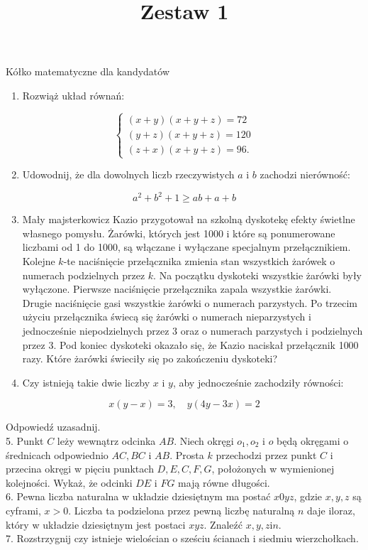 \documentclass[10pt]{article}
\title{Zestaw 1 }
\author{}
\date{}
\begin{document}
\maketitle
Kółko matematyczne dla kandydatów

\begin{enumerate}
  \item Rozwiąż układ równań:
\end{enumerate}

\[
\left\{\begin{array}{l}
(x+y)(x+y+z)=72 \\
(y+z)(x+y+z)=120 \\
(z+x)(x+y+z)=96 .
\end{array}\right.
\]

\begin{enumerate}
  \setcounter{enumi}{1}
  \item Udowodnij, że dla dowolnych liczb rzeczywistych \(a\) i \(b\) zachodzi nierówność:
\end{enumerate}

\[
a^{2}+b^{2}+1 \geq a b+a+b
\]

\begin{enumerate}
  \setcounter{enumi}{2}
  \item Mały majsterkowicz Kazio przygotował na szkolną dyskotekę efekty świetlne własnego pomysłu. Żarówki, których jest 1000 i które są ponumerowane liczbami od 1 do 1000, są włączane i wyłączane specjalnym przełącznikiem. Kolejne \(k\)-te naciśnięcie przełącznika zmienia stan wszystkich żarówek o numerach podzielnych przez \(k\). Na początku dyskoteki wszystkie żarówki były wyłączone. Pierwsze naciśnięcie przełącznika zapala wszystkie żarówki. Drugie naciśnięcie gasi wszystkie żarówki o numerach parzystych. Po trzecim użyciu przełącznika świecą się żarówki o numerach nieparzystych i jednocześnie niepodzielnych przez 3 oraz o numerach parzystych i podzielnych przez 3. Pod koniec dyskoteki okazało się, że Kazio naciskał przełącznik 1000 razy. Które żarówki świeciły się po zakończeniu dyskoteki?
  \item Czy istnieją takie dwie liczby \(x\) i \(y\), aby jednocześnie zachodziły równości:
\end{enumerate}

\[
x(y-x)=3, \quad y(4 y-3 x)=2
\]

Odpowiedź uzasadnij.\\
5. Punkt \(C\) leży wewnątrz odcinka \(A B\). Niech okręgi \(o_{1}, o_{2}\) i \(o\) będą okręgami o średnicach odpowiednio \(A C, B C\) i \(A B\). Prosta \(k\) przechodzi przez punkt \(C\) i przecina okręgi w pięciu punktach \(D, E, C, F, G\), położonych w wymienionej kolejności. Wykaż, że odcinki \(D E\) i \(F G\) mają równe długości.\\
6. Pewna liczba naturalna w układzie dziesiętnym ma postać \(x 0 y z\), gdzie \(x, y, z\) są cyframi, \(x>0\). Liczba ta podzielona przez pewną liczbę naturalną \(n\) daje iloraz, który w układzie dziesiętnym jest postaci \(x y z\). Znaleźć \(x, y, z \mathrm{i} n\).\\
7. Rozstrzygnij czy istnieje wielościan o sześciu ścianach i siedmiu wierzchołkach.
\end{document}
